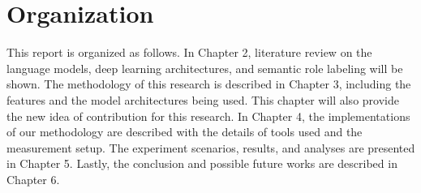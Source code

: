 
\section{Organization}
This report is organized as follows. In Chapter 2, literature review on the language models, deep learning architectures, and semantic role labeling will be shown. The methodology of this research is described in Chapter 3, including the features and the model architectures being used. This chapter will also provide the new idea of contribution for this research. In Chapter 4, the implementations of our methodology are described with the details of tools used and the measurement setup. The experiment scenarios, results, and analyses are presented in Chapter 5. Lastly, the conclusion and possible future works are described in Chapter 6.

